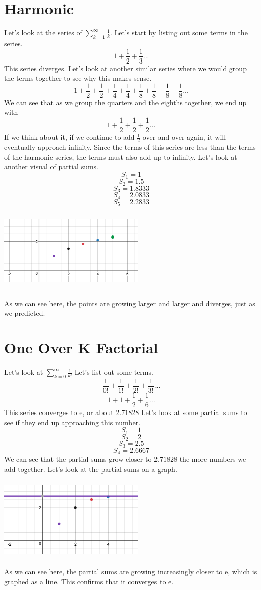 \documentclass[a4paper,openright, 14pt]{article}
\begin{document}
\section*{Harmonic}
Let's look at the series of $\sum\limits_{k=1}^{\infty} \frac{1}{k}$. Let's start by listing out some terms in the series.
$$1+\frac{1}{2}+\frac{1}{3}...$$
This series diverges. Let's look at another similar series where we would group the terms together to see why this makes sense.
$$1+\frac{1}{2}+\frac{1}{2}+\frac{1}{4}+\frac{1}{4}+\frac{1}{8}+\frac{1}{8}+\frac{1}{8}+\frac{1}{8}...$$
We can see that as we group the quarters and the eighths together, we end up with 
$$1+\frac{1}{2}+\frac{1}{2}+\frac{1}{2}...$$
If we think about it, if we continue to add $\frac{1}{2}$ over and over again, it will eventually approach infinity. Since the terms of this series are less than the terms of the harmonic series, the terms must also add up to infinity. Let's look at another visual of partial sums.
$$S_1=1$$
$$S_2=1.5$$
$$S_3=1.8333$$
$$S_4=2.0833$$
$$S_5=2.2833$$
\begin{center}
    \includegraphics[height=4cm, width=7cm]{Images/graph2.png}
\end{center}
As we can see here, the points are growing larger and larger and diverges, just as we predicted.
\section*{One Over K Factorial}
Let's look at $\sum\limits_{k=0}^{\infty} \frac{1}{k!}$ Let's list out some terms.
$$\frac{1}{0!}+\frac{1}{1!}+\frac{1}{2!}+\frac{1}{3!}...$$
$$1+1+\frac{1}{2}+\frac{1}{6}...$$
This series converges to e, or about $2.71828$ Let's look at some partial sums to see if they end up approaching this number.
$$S_1=1$$
$$S_2=2$$
$$S_3=2.5$$
$$S_4=2.6667$$
We can see that the partial sums grow closer to $2.71828$ the more numbers we add together. Let's look at the partial sums on a graph.
\begin{center}
    \includegraphics[height=4cm, width=7cm]{Images/graph3.png}
\end{center}
As we can see here, the partial sums are growing increasingly closer to e, which is graphed as a line. This confirms that it converges to e.
\end{document}
